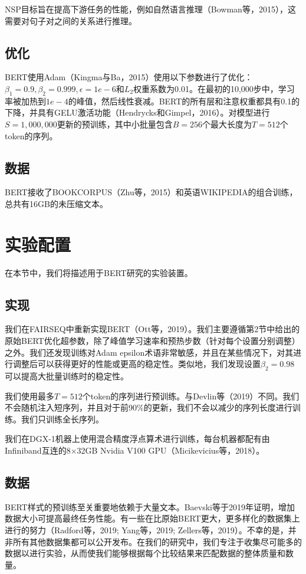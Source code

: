 \documentclass[lang=cn,11pt,a4paper,twocolumn]{elegantpaper}
\begin{document}
NSP目标旨在提高下游任务的性能，例如自然语言推理（Bowman等，2015），这需要对句子对之间的关系进行推理。

\subsection{优化}
BERT使用Adam（Kingma与Ba，2015）使用以下参数进行了优化：$\beta_1= 0.9,\beta_2= 0.999,\epsilon=1e-6$和$L_2$权重系数为0.01。在最初的10,000步中，学习率被加热到$1e-4$的峰值，然后线性衰减。BERT的所有层和注意权重都具有0.1的下降，并具有GELU激活功能（Hendrycks和Gimpel，2016）。对模型进行$S = 1,000,000$更新的预训练，其中小批量包含$B = 256$个最大长度为$T = 512$个token的序列。

\subsection{数据}
BERT接收了BOOKCORPUS（Zhu等，2015）和英语WIKIPEDIA的组合训练，总共有16GB的未压缩文本。

\section{实验配置}
在本节中，我们将描述用于BERT研究的实验装置。
\subsection{实现}
我们在FAIRSEQ中重新实现BERT（Ott等，2019）。我们主要遵循第2节中给出的原始BERT优化超参数，除了峰值学习速率和预热步数（针对每个设置分别调整）之外。我们还发现训练对Adam epsilon术语非常敏感，并且在某些情况下，对其进行调整后可以获得更好的性能或更高的稳定性。类似地，我们发现设置$\beta_2= 0.98$可以提高大批量训练时的稳定性。

我们使用最多$T = 512$个token的序列进行预训练。与Devlin等（2019）不同。我们不会随机注入短序列，并且对于前90\%的更新，我们不会以减少的序列长度进行训练。我们只训练全长序列。

我们在DGX-1机器上使用混合精度浮点算术进行训练，每台机器都配有由Infiniband互连的8×32GB Nvidia V100 GPU（Micikevicius等，2018）。
\subsection{数据}
BERT样式的预训练至关重要地依赖于大量文本。Baevski等于2019年证明，增加数据大小可提高最终任务性能。有一些在比原始BERT更大，更多样化的数据集上进行的努力（Radford等，2019; Yang等，2019; Zellers等，2019）。不幸的是，并非所有其他数据集都可以公开发布。在我们的研究中，我们专注于收集尽可能多的数据以进行实验，从而使我们能够根据每个比较结果来匹配数据的整体质量和数量。
\end{document}
